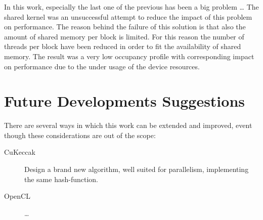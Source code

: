 In this work, especially the last one of the previous has been a big problem \dots
The shared kernel was an unsuccessful attempt to reduce the impact of this problem on performance. The reason behind the failure of this solution is that also the amount of shared memory per block is limited. For this reason the number of threads per block have been reduced in order to fit the availability of shared memory. The result was a very low occupancy profile with corresponding impact on performance due to the under usage of the device resources.

\section{Future Developments Suggestions}
There are several ways in which this work can be extended and improved, event though these considerations are out of the scope:
\begin{description}
\item [CuKeccak] Design a brand new algorithm, well suited for parallelism, implementing the same hash-function.
\item [OpenCL] \dots
\end{description}

